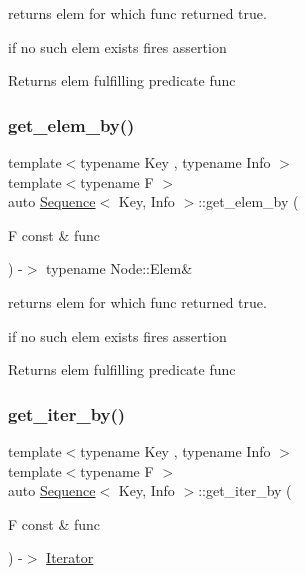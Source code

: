returns elem for which func returned true. 

if no such elem exists fires assertion \begin{DoxyReturn}{Returns}
elem fulfilling predicate func 
\end{DoxyReturn}
\mbox{\label{structSequence_ae2a2c13841d5be141a98afc16919f543}} 
\subsubsection{\texorpdfstring{get\_elem\_by()}{get\_elem\_by()}\hspace{0.1cm}{\footnotesize\ttfamily [2/2]}}
{\footnotesize\ttfamily template$<$typename Key , typename Info $>$ \\
template$<$typename F $>$ \\
auto \mbox{\hyperlink{structSequence}{Sequence}}$<$ Key, Info $>$\+::get\+\_\+elem\+\_\+by (\begin{DoxyParamCaption}\item[{F const \&}]{func }\end{DoxyParamCaption}) -\/$>$ typename Node\+::\+Elem\& \hspace{0.3cm}{\ttfamily [inline]}}



returns elem for which func returned true. 

if no such elem exists fires assertion \begin{DoxyReturn}{Returns}
elem fulfilling predicate func 
\end{DoxyReturn}
\mbox{\label{structSequence_ad1f8bf2f99679f9893cd77cdbadd0732}} 
\subsubsection{\texorpdfstring{get\_iter\_by()}{get\_iter\_by()}\hspace{0.1cm}{\footnotesize\ttfamily [1/2]}}
{\footnotesize\ttfamily template$<$typename Key , typename Info $>$ \\
template$<$typename F $>$ \\
auto \mbox{\hyperlink{structSequence}{Sequence}}$<$ Key, Info $>$\+::get\+\_\+iter\+\_\+by (\begin{DoxyParamCaption}\item[{F const \&}]{func }\end{DoxyParamCaption}) -\/$>$ \mbox{\hyperlink{structSequence_1_1Iterator}{Iterator}} \hspace{0.3cm}{\ttfamily [inline]}}



